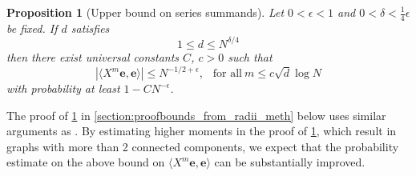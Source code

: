\documentclass[10pt,a4paper]{amsart}
\newcommand{\abs}[1]{\left| #1 \right|}
\newtheorem{prop}{Proposition}[section]
\numberwithin{equation}{section}
\newcommand{\nc}{\normalcolor}
\begin{document}
\nc 

\begin{prop}[Upper bound on series summands] \label{prop:bounds_from_radii_meth}
Let $ 0 < \epsilon <1$ and $0 < \delta < \frac{1}{4} \epsilon$ be fixed. 
If $d$ satisfies 
\begin{equation}\label{eq:regimed3}
   1 \le d \le N^{\delta/4}
\end{equation}
then there exist universal constants $C$, $c>0$ such that
    \begin{equation*}
       \abs{ \langle X^{m}\mathbf{e}, \mathbf{e}\rangle } \le N^{-1/2 + \epsilon} , ~~ \text{ for all}~ m \le c \sqrt{d}\log N
    \end{equation*}
    with probability at least $1 - CN^{-\epsilon}$.
\end{prop}
The proof of \cref{prop:bounds_from_radii_meth} in \cref{section:proofbounds_from_radii_meth} below uses similar arguments as \cite[Sections 5.1 and 6]{BBK_spec_radii}. By estimating higher moments in the proof of \cref{prop:bounds_from_radii_meth}, which result in graphs with more than 2 connected components,  
we expect that the probability estimate on the above bound on $\langle X^{m}\mathbf{e}, \mathbf{e}\rangle$ 
can be substantially improved. 
\end{document}
